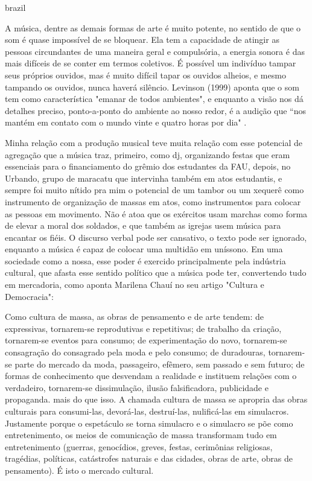 \begin{otherlanguage*}{brazil}

A música, dentre as demais formas de arte é muito potente, no sentido de que o som é quase impossível de se bloquear. Ela tem a capacidade de atingir as pessoas circundantes de uma maneira geral e compulsória, a energia sonora é das mais difíceis de se conter em termos coletivos. É possível um indivíduo tampar seus próprios ouvidos, mas é muito difícil tapar os ouvidos alheios, e mesmo tampando os ouvidos, nunca haverá silêncio. Levinson (1999) aponta que o som tem como característica "emanar de todos ambientes", e enquanto a visão nos dá detalhes preciso, ponto-a-ponto do ambiente ao nosso redor, é a audição que ``nos mantém em contato com o mundo vinte e quatro horas por dia" \cite[47]{Levinson2001}. 


Minha relação com a produção musical teve muita relação com esse potencial de agregação que a música traz, primeiro, como dj, organizando festas que eram essenciais para o financiamento do grêmio dos estudantes da FAU, depois, no Urbando, grupo de maracatu que intervinha também em atos estudantis, e sempre foi muito nítido pra mim o potencial de um tambor ou um xequerê como instrumento de organização de massas em atos, como instrumentos para colocar as pessoas em movimento. Não é atoa que os exércitos usam marchas como forma de elevar a moral dos soldados, e que também as igrejas usem música para encantar os fiéis. O discurso verbal pode ser cansativo, o texto pode ser ignorado, enquanto a música é capaz de colocar uma multidão em uníssono. Em uma sociedade como a nossa, esse poder é exercido principalmente pela indústria cultural, que afasta esse sentido político que a música pode ter, convertendo tudo em mercadoria, como aponta Marilena Chauí no seu artigo "Cultura e Democracia": 

\begin{citacao}

Como cultura de massa, as obras de pensamento e de arte tendem: de expressivas, tornarem-se reprodutivas e repetitivas; de trabalho da criação, tornarem-se eventos para consumo; de experimentação do novo, tornarem-se consagração do consagrado pela moda e pelo consumo; de duradouras, tornarem-se parte do mercado da moda, passageiro, efêmero, sem passado e sem futuro; de formas de conhecimento que desvendam a realidade e instituem relações com o verdadeiro, tornarem-se dissimulação, ilusão falsificadora, publicidade e propaganda. mais do que isso. A chamada cultura de massa se apropria das obras culturais para consumi-las, devorá-las, destruí-las, nulificá-las em simulacros. Justamente porque o espetáculo se torna simulacro e o simulacro se põe como entretenimento, os meios de comunicação de massa transformam tudo em entretenimento (guerras, genocídios, greves, festas, cerimônias religiosas, tragédias, políticas, catástrofes naturais e das cidades, obras de arte, obras de pensamento). É isto o mercado cultural. \cite[61]{MarilenaChaui2008}
\end{citacao}


\end{otherlanguage*}
